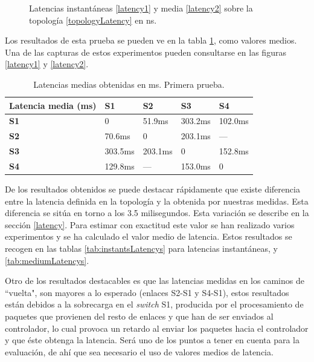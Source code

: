 \documentclass[a4paper,11pt]{book}
\begin{document}
\begin{figure}[tb]
\caption{Latencias instantáneas \ref{latency1} y media \ref{latency2} sobre la topología \ref{topologyLatency} en ns.}\label{latencias}
\end{figure}

Los resultados de esta prueba se pueden ve en  la tabla \ref{resultsLatency1}, como valores medios. Una de las capturas de estos experimentos pueden consultarse en las figuras \ref{latency1} y \ref{latency2}. 

\begin{table}[tb]
\begin{center}
\begin{tabular}{|l|l|l|l|l|}
\hline
{\bf Latencia media (ms)} & {\bf S1} & {\bf S2} & {\bf S3} & {\bf S4} \\ \hline
{\bf S1}                  & 0        & 51.9ms   & 303.2ms  & 102.0ms  \\ \hline
{\bf S2}                  & 70.6ms   & 0        & 203.1ms  & ---     \\ \hline
{\bf S3}                  & 303.5ms  & 203.1ms  & 0        & 152.8ms  \\ \hline
{\bf S4}                  & 129.8ms  & ---     & 153.0ms  & 0        \\ \hline
\end{tabular}
\caption{Latencias medias obtenidas en ms. Primera prueba.}\label{resultsLatency1}
\end{center}
\end{table}

De los resultados obtenidos se puede destacar rápidamente que existe diferencia entre la latencia definida en la topología y la obtenida por nuestras medidas. Esta diferencia se sitúa en torno a los 3.5 milisegundos. Esta variación se describe en la sección \ref{latency}. Para estimar con exactitud este valor se han realizado varios experimentos y se ha calculado el valor medio de latencia. Estos resultados se recogen en las tablas \ref{tab:instantsLatencys} para latencias instantáneas, y \ref{tab:mediumLatencys}.

Otro de los resultados destacables es que las latencias medidas en los caminos de ``vuelta", son mayores a lo esperado (enlaces S2-S1 y S4-S1), estos resultados están debidos a la sobrecarga en el \textit{switch} S1, producida por el procesamiento de paquetes que provienen del resto de enlaces y que han de ser enviados al controlador, lo cual provoca un retardo al enviar los paquetes hacia el controlador y que éste obtenga la latencia. Será uno de los puntos a tener en cuenta para la evaluación, de ahí que sea necesario el uso de valores medios de latencia.
\end{document}
